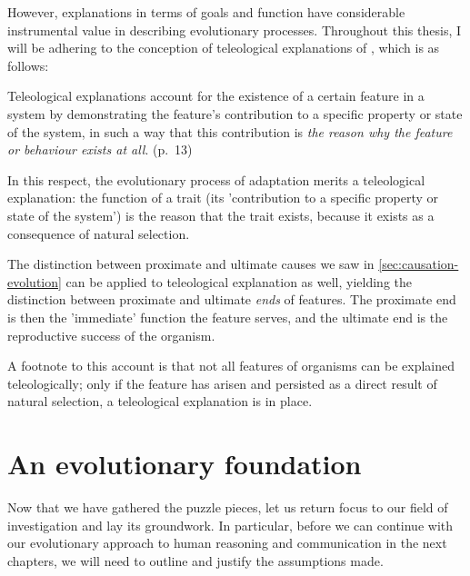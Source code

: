 However, explanations in terms of goals and function have considerable instrumental value in describing evolutionary processes. Throughout this thesis, I will be adhering to the conception of teleological explanations of \citet{Ayala99}, which is as follows:
\begin{quoting}
    Teleological explanations account for the existence of a certain feature in a system by demonstrating the feature’s contribution to a specific property or state of the system, in such a way that this contribution is \emph{the reason why the feature or behaviour exists at all}.
    \hfill (p.~13)
\end{quoting}
In this respect, the evolutionary process of adaptation merits a teleological explanation: the function of a trait (its 'contribution to a specific property or state of the system') is the reason that the trait exists, because it exists as a consequence of natural selection.

The distinction between proximate and ultimate causes we saw in \cref{sec:causation-evolution} can be applied to teleological explanation as well, yielding the distinction between proximate and ultimate \emph{ends} of features. The proximate end is then the 'immediate' function the feature serves, and the ultimate end is the reproductive success of the organism.

A footnote to this account is that not all features of organisms can be explained teleologically; only if the feature has arisen and persisted as a direct result of natural selection, a teleological explanation is in place.


\section{An evolutionary foundation}
Now that we have gathered the puzzle pieces, let us return focus to our field of investigation and lay its groundwork. In particular, before we can continue with our evolutionary approach to human reasoning and communication in the next chapters, we will need to outline and justify the assumptions made.

